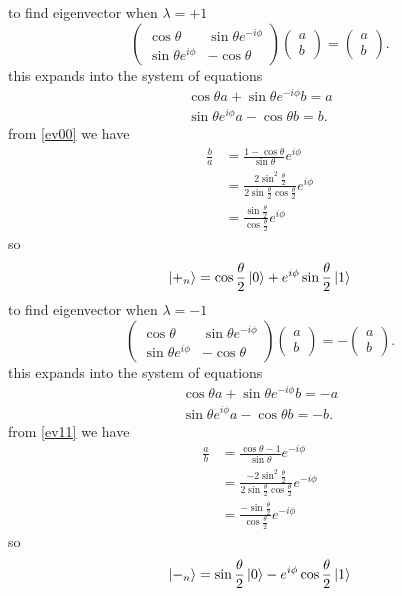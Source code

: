 \documentclass{article}
\begin{document}
to find eigenvector when \(\lambda = +1\)
\[
\begin{pmatrix} \cos\theta & \sin\theta e^{-i\phi} \\ \sin\theta e^{i\phi} & -\cos\theta \end{pmatrix}
\begin{pmatrix} a \\ b \end{pmatrix}
=
\begin{pmatrix} a \\ b \end{pmatrix}.
\]
this expands into the system of equations
\begin{align}
    \cos\theta a + \sin\theta e^{-i\phi} b = a \label{ev00}\\
    \sin\theta e^{i\phi} a - \cos\theta b = b. \label{ev01}   
\end{align}
from \ref{ev00} we have
\begin{align*}    
\frac{b}{a} &= \frac{1 - \cos\theta}{\sin\theta}e^{i\phi}\\
&= \frac{2 \sin^2 \frac{\theta}{2}}{2 \sin \frac{\theta}{2} \cos \frac{\theta}{2}} e^{i\phi} \\
&= \frac{\sin \frac{\theta}{2}}{\cos \frac{\theta}{2}} e^{i\phi}
\end{align*}
so
\begin{align*}
    \ket{+_n} = \cos \frac{\theta}{2} \ket{0} + e^{i\phi}\sin \frac{\theta}{2} \ket{1}
\end{align*}
to find eigenvector when \(\lambda = -1\)
\[
\begin{pmatrix} \cos\theta & \sin\theta e^{-i\phi} \\ \sin\theta e^{i\phi} & -\cos\theta \end{pmatrix}
\begin{pmatrix} a \\ b \end{pmatrix}
=
-\begin{pmatrix} a \\ b \end{pmatrix}.
\]
this expands into the system of equations
\begin{align}
    \cos\theta a + \sin\theta e^{-i\phi} b = -a \label{ev10}\\
    \sin\theta e^{i\phi} a - \cos\theta b = -b. \label{ev11}   
\end{align}
from \ref{ev11} we have
\begin{align*}    
\frac{a}{b} &= \frac{\cos\theta - 1}{\sin\theta}e^{-i\phi}\\
&= \frac{-2 \sin^2 \frac{\theta}{2}}{2 \sin \frac{\theta}{2} \cos \frac{\theta}{2}} e^{-i\phi} \\
&= \frac{-\sin \frac{\theta}{2}}{\cos \frac{\theta}{2}} e^{-i\phi}
\end{align*}
so
\begin{align*}
    \ket{-_n} = \sin \frac{\theta}{2} \ket{0} - e^{i\phi}\cos \frac{\theta}{2} \ket{1}
\end{align*}
\end{document}
